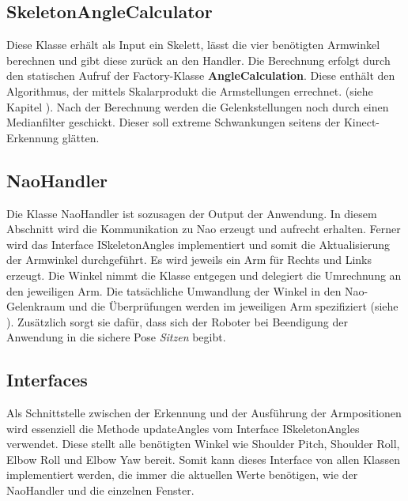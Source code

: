 %
%

\subsection{SkeletonAngleCalculator}
Diese Klasse erhält als Input ein Skelett, lässt die vier benötigten Armwinkel berechnen und gibt diese zurück an den Handler. Die Berechnung erfolgt durch den statischen Aufruf der Factory-Klasse \textbf{AngleCalculation}. Diese enthält den Algorithmus, der mittels Skalarprodukt die Armstellungen errechnet. (siehe Kapitel ). Nach der Berechnung werden die Gelenkstellungen noch durch einen Medianfilter geschickt. Dieser soll extreme Schwankungen seitens der Kinect-Erkennung glätten.

\subsection{NaoHandler}
Die Klasse \textsf{NaoHandler} ist sozusagen der Output der Anwendung. In diesem Abschnitt wird die Kommunikation zu Nao erzeugt und aufrecht erhalten. Ferner wird das Interface \textsf{ISkeletonAngles} implementiert und somit die Aktualisierung der Armwinkel durchgeführt. Es wird jeweils ein Arm für Rechts und Links erzeugt. Die Winkel nimmt die Klasse entgegen und delegiert die Umrechnung an den jeweiligen Arm. Die tatsächliche Umwandlung der Winkel in den Nao-Gelenkraum und die Überprüfungen werden im jeweiligen Arm spezifiziert (siehe ). Zusätzlich sorgt sie dafür, dass sich der Roboter bei Beendigung der Anwendung in die sichere Pose \textit{Sitzen} begibt.



\subsection{Interfaces}
Als Schnittstelle zwischen der Erkennung und der Ausführung der Armpositionen wird essenziell die Methode \textsf{updateAngles} vom Interface \textsf{ISkeletonAngles} verwendet. Diese stellt alle benötigten Winkel wie Shoulder Pitch, Shoulder Roll, Elbow Roll und Elbow Yaw bereit. Somit kann dieses Interface von allen Klassen implementiert werden, die immer die aktuellen Werte benötigen, wie der NaoHandler und die einzelnen Fenster.


